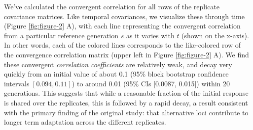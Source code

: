 \documentclass[11pt]{article}
\newcommand{\vb}[1]{{\it \color{blue} #1}}
\begin{document}
We've calculated the convergent correlation for all rows of the replicate
covariance matrices. Like temporal covariances, we visualize these through time
(Figure \ref{fig:figure-2} A), with each line representing the convergent
correlation from a particular reference generation $s$ as it varies with $t$
(shown on the x-axis). In other words, each of the colored lines corresponds to
the like-colored row of the convergence correlation matrix (upper left in
Figure \ref{fig:figure-2} A). We find these convergent \vb{correlation
coefficients} are relatively weak, and decay very quickly from an initial value
of about 0.1 (95\% block bootstrap confidence intervals $[0.094, 0.11]$) to
around 0.01 (95\% CIs [0.0087, 0.015]) within 20 generations. This suggests
that while a reasonable fraction of the initial response is shared over the
replicates, this is followed by a rapid decay, a result consistent with the
primary finding of the original \textcite{Barghi2019-qy} study: that
alternative loci contribute to longer term adaptation across the different
replicates. 
\end{document}

